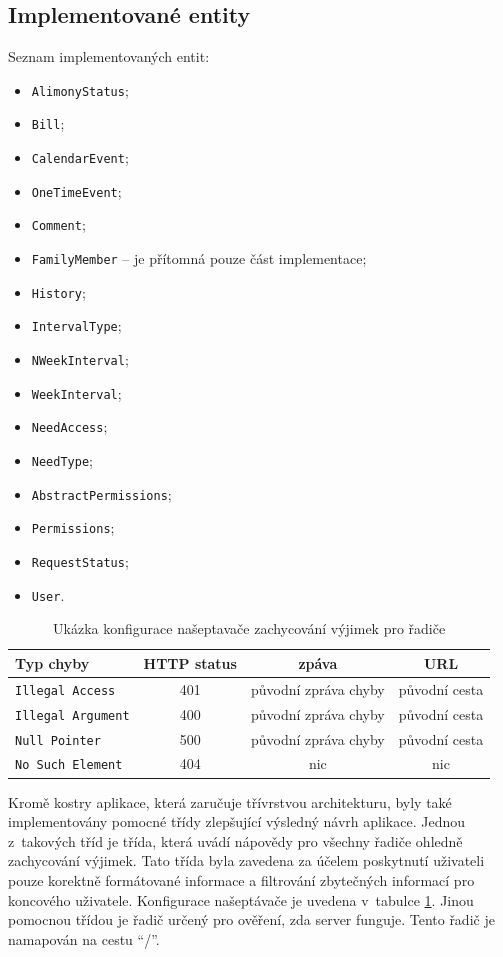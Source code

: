     \subsection{Implementované entity}\label{analyza:implementace:tridy}
        Seznam implementovaných entit:
        \begin{itemize}
            \setlength\itemsep{0.3em}
            \item \texttt{AlimonyStatus};
            \item \texttt{Bill};
            \item \texttt{CalendarEvent};
            \item \texttt{OneTimeEvent};
            \item \texttt{Comment};
            \item \texttt{FamilyMember} -- je přítomná pouze část implementace;
            \item \texttt{History};
            \item \texttt{IntervalType};
            \item \texttt{NWeekInterval};
            \item \texttt{WeekInterval};
            \item \texttt{NeedAccess};
            \item \texttt{NeedType};
            \item \texttt{AbstractPermissions};
            \item \texttt{Permissions};
            \item \texttt{RequestStatus};
            \item \texttt{User}.
        \end{itemize}
        
        \begin{table}\centering
	    \begin{tabular}{|l|c|c|c|}\hline
		  Typ chyby		& HTTP status		& zpáva	& URL	\tabularnewline \hline \hline
		  \texttt{Illegal Access}	& 401	& původní zpráva chyby		& původní cesta     \tabularnewline \hline
		  \texttt{Illegal Argument}	& 400	& původní zpráva chyby		& původní cesta     \tabularnewline \hline
		  \texttt{Null Pointer}	& 500	& původní zpráva chyby		& původní cesta     \tabularnewline \hline
		  \texttt{No Such Element}	& 404	& nic		& nic     \tabularnewline \hline
	    \end{tabular}\caption[Konfigurace našeptávače pro řadiče]{Ukázka konfigurace našeptavače zachycování výjimek pro řadiče}\label{tab:excpetion-handler1}
        \end{table}
        Kromě kostry aplikace, která zaručuje třívrstvou architekturu, byly také implementovány pomocné třídy zlepšující výsledný návrh aplikace. Jednou z~takových tříd je třída, která uvádí nápovědy pro všechny řadiče ohledně zachycování výjimek. Tato třída byla zavedena za účelem poskytnutí uživateli pouze korektně formátované informace a filtrování zbytečných informací pro koncového uživatele. Konfigurace našeptávače je uvedena v~tabulce \ref{tab:excpetion-handler1}. Jinou pomocnou třídou je řadič určený pro ověření, zda server funguje. Tento řadič je namapován na cestu \enquote{/}.
        
